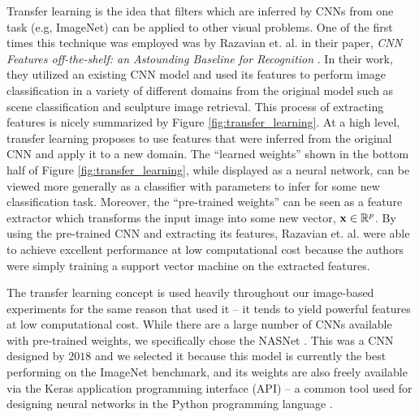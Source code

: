 \documentclass[../thesis.tex]{subfiles}
\begin{document}
Transfer learning is the idea that filters which are inferred by CNNs from one task (e.g, ImageNet) can be applied to other visual problems. One of the first times this technique was employed was by Razavian et. al. in their paper, \textit{CNN Features off-the-shelf: an Astounding Baseline for Recognition} \cite{sharif2014cnn}. In their work, they utilized an existing CNN model and used its features to perform image classification in a variety of different domains from the original model such as scene classification and sculpture image retrieval. This process of extracting features is nicely summarized by Figure \ref{fig:transfer_learning}. At a high level, transfer learning proposes to use features that were inferred from the original CNN and apply it to a new domain. The ``learned weights'' shown in the bottom half of Figure \ref{fig:transfer_learning}, while displayed as a neural network, can be viewed more generally as a classifier with parameters to infer for some new classification task. Moreover, the ``pre-trained weights'' can be seen as a feature extractor which transforms the input image into some new vector, $\mathbf{x} \in \mathbb{R}^p$. By using the pre-trained CNN and extracting its features, Razavian et. al. were able to achieve excellent performance at low computational cost because the authors were simply training a support vector machine on the extracted features. 

The transfer learning concept is used heavily throughout our image-based experiments for the same reason that \cite{sharif2014cnn} used it -- it tends to yield powerful features at low computational cost. While there are a large number of CNNs available with pre-trained weights, we specifically chose the NASNet \cite{zoph2018learning}. This was a CNN designed by $2018$ and we selected it because this model is currently the best performing on the ImageNet benchmark, and its weights are also freely available via the Keras application programming interface (API) -- a common tool used for designing neural networks in the Python programming language \cite{chollet2015keras}.
\end{document}
